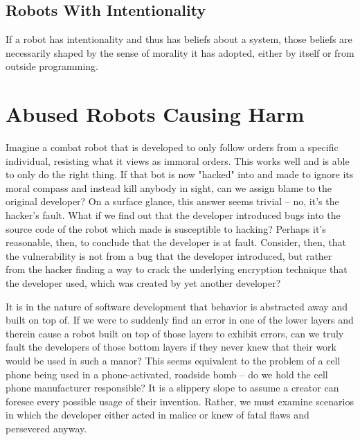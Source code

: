 \documentclass[12]{article}
\begin{document}
	\subsection{Robots With Intentionality}
		If a robot has intentionality and thus has beliefs about a system, those beliefs are necessarily shaped by the sense of morality it has adopted, either by itself or from outside programming. 
			
\section{Abused Robots Causing Harm}	
	Imagine a combat robot that is developed to only follow orders from a specific individual, resisting what it views as immoral orders. This works well and is able to only do the right thing. If that bot is now "hacked" into and made to ignore its moral compass and instead kill anybody in sight, can we assign blame to the original developer? On a surface glance, this answer seems trivial -- no, it's the hacker's fault. What if we find out that the developer introduced bugs into the source code of the robot which made is susceptible to hacking? Perhaps it's reasonable, then, to conclude that the developer is at fault. Consider, then, that the vulnerability is not from a bug that the developer introduced, but rather from the hacker finding a way to crack the underlying encryption technique that the developer used, which was created by yet another developer? 
	
	It is in the nature of software development that behavior is abstracted away and built on top of. If we were to suddenly find an error in one of the lower layers and therein cause a robot built on top of those layers to exhibit errors, can we truly fault the developers of those bottom layers if they never knew that their work would be used in such a manor? This seems equivalent to the problem of a cell phone being used in a phone-activated, roadside bomb -- do we hold the cell phone manufacturer responsible? It is a slippery slope to assume a creator can foresee every possible usage of their invention. Rather, we must examine scenarios in which the developer either acted in malice or knew of fatal flaws and persevered anyway. 
\end{document}
